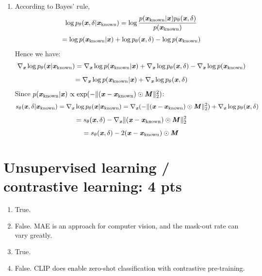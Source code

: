 \documentclass[12pt]{article}
\begin{document}
\begin{enumerate}
    \item According to Bayes' rule, 
    \[\log p_\theta(\textbf{\textit{x}},\delta|\textbf{\textit{x}}_\text{known}) = \log\frac{p(\textbf{\textit{x}}_\text{known}|\textbf{\textit{x}})p_\theta(\textbf{\textit{x}},\delta)}{p(\textbf{\textit{x}}_\text{known})}\] 
    \[= \log p(\textbf{\textit{x}}_\text{known}|\textbf{\textit{x}}) + \log p_\theta(\textbf{\textit{x}},\delta) - \log p(\textbf{\textit{x}}_\text{known})\]
    Hence we have:
    \[\nabla_\textbf{\textit{x}}\log p_\theta(\textbf{\textit{x}}|\textbf{\textit{x}}_\text{known}) = \nabla_\textbf{\textit{x}}\log p(\textbf{\textit{x}}_\text{known}|\textbf{\textit{x}}) + \nabla_\textbf{\textit{x}}\log p_\theta(\textbf{\textit{x}},\delta) - \nabla_\textbf{\textit{x}}\log p(\textbf{\textit{x}}_\text{known})\]
    \[= \nabla_\textbf{\textit{x}}\log p(\textbf{\textit{x}}_\text{known}|\textbf{\textit{x}}) + \nabla_\textbf{\textit{x}}\log p_\theta(\textbf{\textit{x}},\delta)\]
    Since $p(\textbf{\textit{x}}_\text{known}|\textbf{\textit{x}})\propto\exp(-\|(\textbf{\textit{x}}-\textbf{\textit{x}}_\text{known})\odot\textbf{\textit{M}}\|^2_2)$:
    \[s_\theta(\textbf{\textit{x}},\delta|\textbf{\textit{x}}_\text{known}) = \nabla_\textbf{\textit{x}}\log p_\theta(\textbf{\textit{x}}|\textbf{\textit{x}}_\text{known}) = \nabla_\textbf{\textit{x}}(-\|(\textbf{\textit{x}}-\textbf{\textit{x}}_\text{known})\odot\textbf{\textit{M}}\|_2^2) + \nabla_\textbf{\textit{x}}\log p_\theta(\textbf{\textit{x}},\delta)\]
    \[= s_\theta(\textbf{\textit{x}},\delta) - \nabla_\textbf{\textit{x}}\|(\textbf{\textit{x}}-\textbf{\textit{x}}_\text{known})\odot\textbf{\textit{M}}\|_2^2\]
    \[= s_\theta(\textbf{\textit{x}},\delta) - 2(\textbf{\textit{x}} - \textbf{\textit{x}}_\text{known})\odot\textbf{\textit{M}}\]
\end{enumerate}
\newpage

\section{Unsupervised learning / contrastive learning: 4 pts}
\begin{enumerate}
    \item True.
    \item False. MAE is an approach for computer vision, and the mask-out rate can vary greatly.
    \item True.
    \item False. CLIP does enable zero-shot classification with contrastive pre-training.
\end{enumerate}
\newpage
\end{document}
